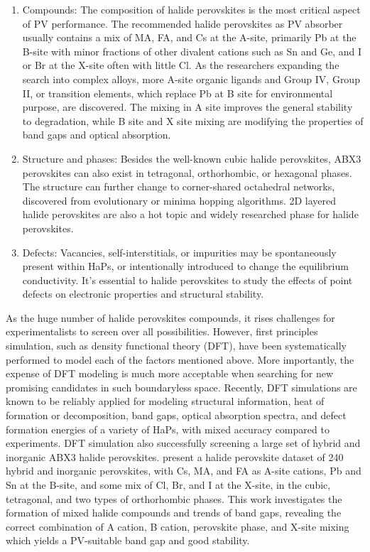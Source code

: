 \documentclass[twoside, twocolumn, 9pt, draft]{article}
\begin{document}
\begin{enumerate}
\item Compounds: The composition of halide perovskites is the most
critical aspect of PV performance. The recommended halide
perovskites as PV absorber usually contains a mix of MA, FA, and Cs
at the A-site, primarily Pb at the B-site with minor fractions of
other divalent cations such as Sn and Ge, and I or Br at the X-site
often with little Cl. As the researchers expanding the search into
complex alloys, more A-site organic ligands and Group IV, Group II,
or transition elements, which replace Pb at B site for
environmental purpose, are
discovered.\cite{zhu-2019-struc-elect,banerjee-2019-rashb-trigg,ding-2019-cesium-decreas,greenland-2020-correl-phase}
The mixing in A site improves the general stability to degradation,
while B site and X site mixing are modifying the properties of band
gaps and optical absorption.
\item Structure and phases: Besides the well-known cubic halide
perovskites, ABX3 perovskites can also exist in tetragonal,
orthorhombic, or hexagonal phases\cite{kar-2018-comput-screen}. The structure can further
change to corner-shared octahedral networks, discovered from
evolutionary or minima hopping algorithms\cite{kim-2017-hybrid-organ}. 2D layered halide
perovskites are also a hot topic and widely researched phase for
halide perovskites.
\item Defects: Vacancies, self-interstitials, or impurities may be
spontaneously present within HaPs, or intentionally introduced to
change the equilibrium
conductivity\cite{mannodi-kanakkithodi-2019-compr-comput,mannodi-kanakkithodi-2022-data-driven}. It’s
essential to halide perovskites to study the effects of point
defects on electronic properties and structural stability.
\end{enumerate}

As the huge number of halide perovskites compounds, it rises
challenges for experimentalists to screen over all
possibilities. However, first principles simulation, such as density
functional theory (DFT), have been systematically performed to model
each of the factors mentioned above. More importantly, the expense of
DFT modeling is much more acceptable when searching for new promising
candidates in such boundaryless space. Recently, DFT simulations are
known to be reliably applied for modeling structural information, heat
of formation or decomposition, band gaps, optical absorption spectra,
and defect formation energies of a variety of HaPs, with mixed
accuracy compared to
experiments.\cite{mannodi-kanakkithodi-2022-data-driven,yin-2015-halid-perov}
DFT simulation also successfully screening a large set of hybrid and
inorganic ABX3 halide perovskites. \citet{castelli-2014-bandg-calcul}
present a halide perovskite dataset of 240 hybrid and inorganic
perovskites, with Cs, MA, and FA as A-site cations, Pb and Sn at the
B-site, and some mix of Cl, Br, and I at the X-site, in the cubic,
tetragonal, and two types of orthorhombic phases. This work
investigates the formation of mixed halide compounds and trends of
band gaps, revealing the correct combination of A cation, B cation,
perovskite phase, and X-site mixing which yields a PV-suitable band
gap and good stability.
\end{document}
